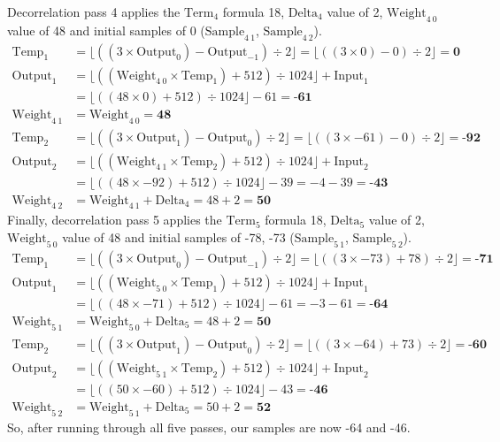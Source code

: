 Decorrelation pass 4 applies the $\text{Term}_4$ formula 18,
$\text{Delta}_4$ value of 2, $\text{Weight}_{4~0}$ value of 48
and initial samples of 0 ($\text{Sample}_{4~1}$, $\text{Sample}_{4~2}$).
\begin{align*}
\text{Temp}_1 &= \lfloor ((3 \times \text{Output}_0) - \text{Output}_{-1}) \div 2 \rfloor = \lfloor ((3 \times 0) - 0) \div 2 \rfloor = \textbf{0} \\
\text{Output}_1 &= \lfloor ((\text{Weight}_{4~0} \times \text{Temp}_1) + 512) \div 1024 \rfloor + \text{Input}_1 \\
&= \lfloor ((48 \times 0) + 512) \div 1024 \rfloor - 61 = \textbf{-61} \\
\text{Weight}_{4~1} &= \text{Weight}_{4~0} = \textbf{48} \\
\text{Temp}_2 &= \lfloor ((3 \times \text{Output}_1) - \text{Output}_0) \div 2 \rfloor = \lfloor ((3 \times -61) - 0) \div 2 \rfloor = \textbf{-92} \\
\text{Output}_2 &= \lfloor ((\text{Weight}_{4~1} \times \text{Temp}_2) + 512) \div 1024 \rfloor + \text{Input}_2 \\
&= \lfloor ((48 \times -92) + 512) \div 1024 \rfloor - 39 = -4 - 39 = \textbf{-43} \\
\text{Weight}_{4~2} &= \text{Weight}_{4~1} + \text{Delta}_4 = 48 + 2 = \textbf{50}
\end{align*}
Finally, decorrelation pass 5 applies the $\text{Term}_5$ formula 18,
$\text{Delta}_5$ value of 2, $\text{Weight}_{5~0}$ value of 48
and initial samples of -78, -73 ($\text{Sample}_{5~1}$,
$\text{Sample}_{5~2}$).
\begin{align*}
\text{Temp}_1 &= \lfloor ((3 \times \text{Output}_0) - \text{Output}_{-1}) \div 2 \rfloor = \lfloor ((3 \times -73) + 78) \div 2 \rfloor = \textbf{-71} \\
\text{Output}_1 &= \lfloor ((\text{Weight}_{5~0} \times \text{Temp}_1) + 512) \div 1024 \rfloor + \text{Input}_1 \\
&= \lfloor ((48 \times -71) + 512) \div 1024 \rfloor - 61 = -3 - 61 = \textbf{-64} \\
\text{Weight}_{5~1} &= \text{Weight}_{5~0} + \text{Delta}_5 = 48 + 2 = \textbf{50} \\
\text{Temp}_2 &= \lfloor ((3 \times \text{Output}_1) - \text{Output}_0) \div 2 \rfloor = \lfloor ((3 \times -64) + 73) \div 2 \rfloor = \textbf{-60} \\
\text{Output}_2 &= \lfloor ((\text{Weight}_{5~1} \times \text{Temp}_2) + 512) \div 1024 \rfloor + \text{Input}_2 \\
&= \lfloor ((50 \times -60) + 512) \div 1024 \rfloor - 43 = \textbf{-46} \\
\text{Weight}_{5~2} &= \text{Weight}_{5~1} + \text{Delta}_5 = 50 + 2 = \textbf{52}
\end{align*}
So, after running through all five passes, our samples are now
-64 and -46.

